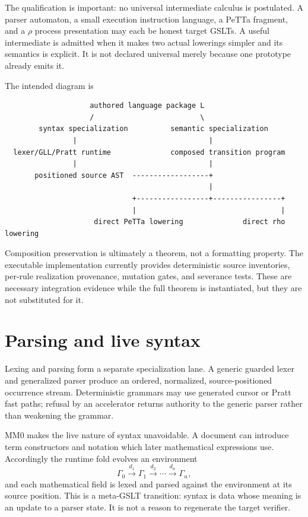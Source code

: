 \documentclass[11pt]{article}
\theoremstyle{remark}
\begin{document}
The qualification is important: no universal intermediate calculus is
postulated.  A parser automaton, a small execution instruction language, a
PeTTa fragment, and a $\rho$ process presentation may each be honest target
GSLTs.  A useful intermediate is admitted when it makes two actual lowerings
simpler and its semantics is explicit.  It is not declared universal merely
because one prototype already emits it.

The intended diagram is
\begin{lstlisting}
                    authored language package L
                    /                         \
        syntax specialization          semantic specialization
                |                               |
  lexer/GLL/Pratt runtime              composed transition program
                |                               |
       positioned source AST  ------------------+
                                                |
                              +-----------------+----------------+
                              |                                  |
                     direct PeTTa lowering              direct rho lowering
\end{lstlisting}

Composition preservation is ultimately a theorem, not a formatting property.
The executable implementation currently provides deterministic source
inventories, per-rule realization provenance, mutation gates, and severance
tests.  These are necessary integration evidence while the full theorem is
instantiated, but they are not substituted for it.

\section{Parsing and live syntax}

Lexing and parsing form a separate specialization lane.  A generic guarded
lexer and generalized parser produce an ordered, normalized, source-positioned
occurrence stream.  Deterministic grammars may use generated cursor or Pratt
fast paths; refusal by an accelerator returns authority to the generic parser
rather than weakening the grammar.

MM0 makes the live nature of syntax unavoidable.  A document can introduce
term constructors and notation which later mathematical expressions use.
Accordingly the runtime fold evolves an environment
\[
  \Gamma_0 \xrightarrow{d_1} \Gamma_1
           \xrightarrow{d_2} \cdots
           \xrightarrow{d_n} \Gamma_n,
\]
and each mathematical field is lexed and parsed against the environment at
its source position.  This is a meta-GSLT transition: syntax is data whose
meaning is an update to a parser state.  It is not a reason to regenerate the
target verifier.
\end{document}
